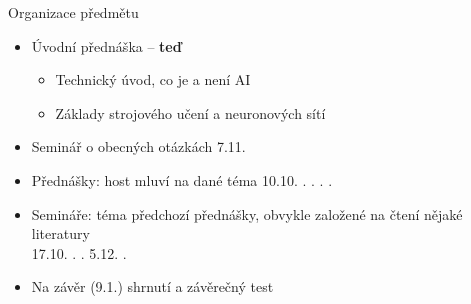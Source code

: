 \begin{frame}{Organizace předmětu}

    \begin{itemize}[<+->]

        \item Úvodní přednáška -- \textbf{teď}

        \begin{itemize}[<+->]

            \item Technický úvod, co je a není AI

            \item Základy strojového učení a neuronových sítí

        \end{itemize}

		\item Seminář o obecných otázkách 7.11.

        \item Přednášky: host mluví na dané téma
            \hfill 10.10. . . . .

        \item Semináře: téma předchozí přednášky, obvykle založené na čtení
            nějaké literatury \\
            \hfill 17.10. . . \quad \phantom{0}5.12. .

        \item Na závěr (9.1.) shrnutí a závěrečný test

    \end{itemize}

    \vspace{5pt}

    \centering

\end{frame}

